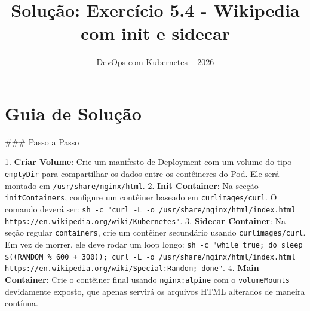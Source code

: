 \documentclass[11pt,a4paper]{article}
\title{\color{secondary}\Huge\textbf{Solução: Exercício 5.4 - Wikipedia com init e sidecar}}
\author{\color{primary}DevOps com Kubernetes -- 2026}
\date{}
\begin{document}
\maketitle

\section*{\color{primary}Guia de Solução}
\begin{tcolorbox}[colback=green!5!white,colframe=green!60!black,title=Resolução Passo a Passo]
### Passo a Passo

1. \textbf{Criar Volume}: Crie um manifesto de Deployment com um volume do tipo \texttt{emptyDir} para compartilhar os dados entre os contêineres do Pod. Ele será montado em \texttt{/usr/share/nginx/html}.
2. \textbf{Init Container}: Na secção \texttt{initContainers}, configure um contêiner baseado em \texttt{curlimages/curl}. O comando deverá ser: \texttt{sh -c "curl -L -o /usr/share/nginx/html/index.html https://en.wikipedia.org/wiki/Kubernetes"}.
3. \textbf{Sidecar Container}: Na seção regular \texttt{containers}, crie um contêiner secundário usando \texttt{curlimages/curl}. Em vez de morrer, ele deve rodar um loop longo: \texttt{sh -c "while true; do sleep \$((RANDOM \% 600 + 300)); curl -L -o /usr/share/nginx/html/index.html https://en.wikipedia.org/wiki/Special:Random; done"}.
4. \textbf{Main Container}: Crie o contêiner final usando \texttt{nginx:alpine} com o \texttt{volumeMounts} devidamente exposto, que apenas servirá os arquivos HTML alterados de maneira contínua.
\end{tcolorbox}
\end{document}
